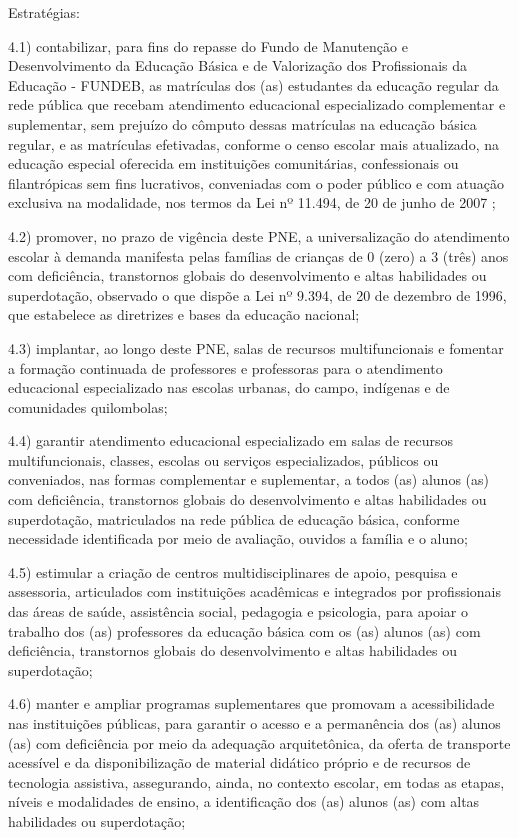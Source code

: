 \documentclass[
]{book}
\begin{document}
Estratégias:

4.1) contabilizar, para fins do repasse do Fundo de Manutenção e Desenvolvimento da Educação Básica e de Valorização dos Profissionais da Educação - FUNDEB, as matrículas dos (as) estudantes da educação regular da rede pública que recebam atendimento educacional especializado complementar e suplementar, sem prejuízo do cômputo dessas matrículas na educação básica regular, e as matrículas efetivadas, conforme o censo escolar mais atualizado, na educação especial oferecida em instituições comunitárias, confessionais ou filantrópicas sem fins lucrativos, conveniadas com o poder público e com atuação exclusiva na modalidade, nos termos da Lei nº 11.494, de 20 de junho de 2007 ;

4.2) promover, no prazo de vigência deste PNE, a universalização do atendimento escolar à demanda manifesta pelas famílias de crianças de 0 (zero) a 3 (três) anos com deficiência, transtornos globais do desenvolvimento e altas habilidades ou superdotação, observado o que dispõe a Lei nº 9.394, de 20 de dezembro de 1996, que estabelece as diretrizes e bases da educação nacional;

4.3) implantar, ao longo deste PNE, salas de recursos multifuncionais e fomentar a formação continuada de professores e professoras para o atendimento educacional especializado nas escolas urbanas, do campo, indígenas e de comunidades quilombolas;

4.4) garantir atendimento educacional especializado em salas de recursos multifuncionais, classes, escolas ou serviços especializados, públicos ou conveniados, nas formas complementar e suplementar, a todos (as) alunos (as) com deficiência, transtornos globais do desenvolvimento e altas habilidades ou superdotação, matriculados na rede pública de educação básica, conforme necessidade identificada por meio de avaliação, ouvidos a família e o aluno;

4.5) estimular a criação de centros multidisciplinares de apoio, pesquisa e assessoria, articulados com instituições acadêmicas e integrados por profissionais das áreas de saúde, assistência social, pedagogia e psicologia, para apoiar o trabalho dos (as) professores da educação básica com os (as) alunos (as) com deficiência, transtornos globais do desenvolvimento e altas habilidades ou superdotação;

4.6) manter e ampliar programas suplementares que promovam a acessibilidade nas instituições públicas, para garantir o acesso e a permanência dos (as) alunos (as) com deficiência por meio da adequação arquitetônica, da oferta de transporte acessível e da disponibilização de material didático próprio e de recursos de tecnologia assistiva, assegurando, ainda, no contexto escolar, em todas as etapas, níveis e modalidades de ensino, a identificação dos (as) alunos (as) com altas habilidades ou superdotação;
\end{document}
